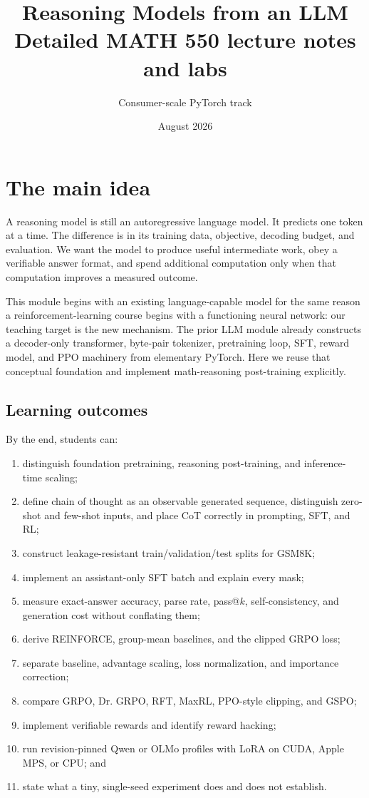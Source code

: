 \documentclass[11pt]{article}
\title{\textbf{Reasoning Models from an LLM}\\\large Detailed MATH 550 lecture notes and labs}
\author{Consumer-scale PyTorch track}
\date{August 2026}
\begin{document}
\maketitle
{\small\tableofcontents}
\newpage

\section{The main idea}
A reasoning model is still an autoregressive language model. It predicts one
token at a time. The difference is in its training data, objective, decoding
budget, and evaluation. We want the model to produce useful intermediate work,
obey a verifiable answer format, and spend additional computation only when that
computation improves a measured outcome.

This module begins with an existing language-capable model for the same reason a
reinforcement-learning course begins with a functioning neural network: our
teaching target is the new mechanism. The prior LLM module already constructs a
decoder-only transformer, byte-pair tokenizer, pretraining loop, SFT, reward
model, and PPO machinery from elementary PyTorch. Here we reuse that conceptual
foundation and implement math-reasoning post-training explicitly.

\subsection{Learning outcomes}
By the end, students can:
\begin{enumerate}
\item distinguish foundation pretraining, reasoning post-training, and
inference-time scaling;
\item define chain of thought as an observable generated sequence, distinguish
zero-shot and few-shot inputs, and place CoT correctly in prompting, SFT, and RL;
\item construct leakage-resistant train/validation/test splits for GSM8K;
\item implement an assistant-only SFT batch and explain every mask;
\item measure exact-answer accuracy, parse rate, pass@$k$, self-consistency, and
generation cost without conflating them;
\item derive REINFORCE, group-mean baselines, and the clipped GRPO loss;
\item separate baseline, advantage scaling, loss normalization, and importance correction;
\item compare GRPO, Dr. GRPO, RFT, MaxRL, PPO-style clipping, and GSPO;
\item implement verifiable rewards and identify reward hacking;
\item run revision-pinned Qwen or OLMo profiles with LoRA on CUDA, Apple MPS, or CPU; and
\item state what a tiny, single-seed experiment does and does not establish.
\end{enumerate}
\end{document}
